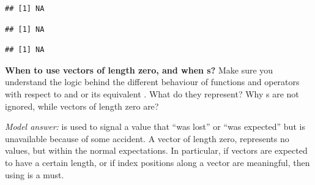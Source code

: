 \documentclass[krantz2]{krantz}\usepackage{knitr}%
\begin{document}
\begin{knitrout}\footnotesize
{}\color{fgcolor}\begin{kframe}
\begin{alltt}
 \hlkwb{<-} 
\end{alltt}
\begin{verbatim}
## [1] NA
\end{verbatim}
\begin{alltt}
 \hlopt{+} 
\end{alltt}
\begin{verbatim}
## [1] NA
\end{verbatim}
\begin{alltt}
 \hlopt{+} 
\end{alltt}
\begin{verbatim}
## [1] NA
\end{verbatim}
\end{kframe}
\end{knitrout}

\begin{playground}
\textbf{When to use vectors of length zero, and when s?} Make sure you understand the logic behind the different behaviour of functions and operators with respect to  and  or its equivalent . What do they represent? Why s are not ignored, while vectors of length zero are?

\begin{knitrout}\footnotesize
{}\color{fgcolor}\begin{kframe}
\begin{alltt}
 \hlopt{+} \hlstd{()}
 \hlopt{+} 
\end{alltt}
\end{kframe}
\end{knitrout}

\emph{Model answer:}
 is used to signal a value that ``was lost'' or ``was expected'' but is unavailable because of some accident. A vector of length zero, represents no values, but within the normal expectations. In particular, if vectors are expected to have a certain length, or if index positions along a vector are meaningful, then using  is a must.

\end{playground}
\end{document}
